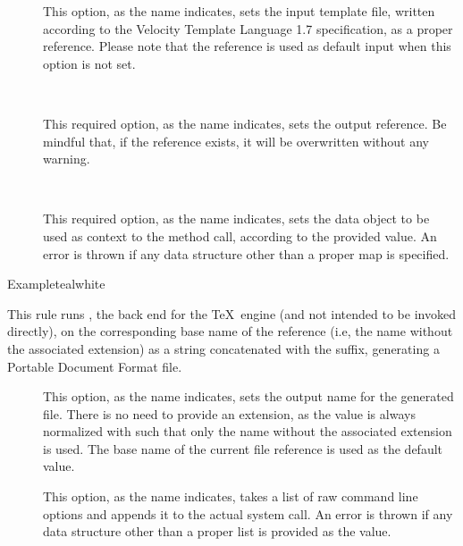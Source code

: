 \begin{description}
\begin{description}
\item[] This option, as the name indicates, sets the input template file, written according to the Velocity Template Language 1.7 specification, as a proper  reference. Please note that the  reference is used as default input when this option is not set.

\item[~\rqbox] This required option, as the name indicates, sets the output  reference. Be mindful that, if the reference exists, it will be overwritten without any warning.

\item[~\rqbox] This required option, as the name indicates, sets the  data object to be used as context to the method call, according to the provided value. An error is thrown if any data structure other than a proper map is specified.
\end{description}

\begin{codebox}{Example}{teal}{\icnote}{white}
\end{codebox}

\item[\rulebox{xdvipdfmx}{Marco Daniel, Paulo Cereda}] This rule runs , the back end for the  \TeX\ engine (and not intended to be invoked directly), on the corresponding base name of the  reference (i.e, the name without the associated extension) as a string concatenated with the  suffix, generating a Portable Document Format  file.

\begin{description}
\item[] This option, as the name indicates, sets the output name for the generated  file. There is no need to provide an extension, as the value is always normalized with  such that only the name without the associated extension is used. The base name of the current file reference is used as the default value.

\item[] This option, as the name indicates, takes a list of raw command line options and appends it to the actual system call. An error is thrown if any data structure other than a proper list is provided as the value.
\end{description}


\end{description}
